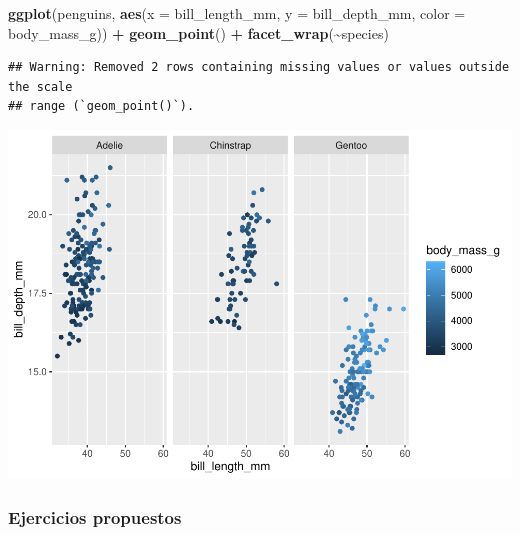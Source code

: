 \documentclass[
]{book}
\newenvironment{Shaded}{\begin{snugshade}}{\end{snugshade}}
\newcommand{\AttributeTok}[1]{\textcolor[rgb]{0.13,0.29,0.53}{#1}}
\newcommand{\FunctionTok}[1]{\textcolor[rgb]{0.13,0.29,0.53}{\textbf{#1}}}
\newcommand{\NormalTok}[1]{#1}
\newcommand{\SpecialCharTok}[1]{\textcolor[rgb]{0.81,0.36,0.00}{\textbf{#1}}}
\begin{document}
\begin{Shaded}
\begin{Highlighting}[]
\FunctionTok{ggplot}\NormalTok{(penguins, }\FunctionTok{aes}\NormalTok{(}\AttributeTok{x =}\NormalTok{ bill\_length\_mm, }\AttributeTok{y =}\NormalTok{ bill\_depth\_mm, }\AttributeTok{color =}\NormalTok{ body\_mass\_g)) }\SpecialCharTok{+}
  \FunctionTok{geom\_point}\NormalTok{() }\SpecialCharTok{+}
  \FunctionTok{facet\_wrap}\NormalTok{(}\SpecialCharTok{\textasciitilde{}}\NormalTok{species)}
\end{Highlighting}
\end{Shaded}

\begin{verbatim}
## Warning: Removed 2 rows containing missing values or values outside the scale
## range (`geom_point()`).
\end{verbatim}

\includegraphics{bookdown-demo_files/figure-latex/unnamed-chunk-195-1.pdf}

\subsubsection{Ejercicios propuestos}\label{ejercicios-propuestos}
\end{document}

